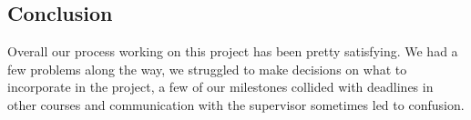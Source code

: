 \documentclass[a4paper,12pt]{article}
\begin{document}
\subsection{Conclusion}
Overall our process working on this project has been pretty satisfying. We had a few problems along the way, we struggled to make decisions on what to incorporate in the project, a few of our milestones collided with deadlines in other courses and communication with the supervisor sometimes led to confusion.
\end{document}

